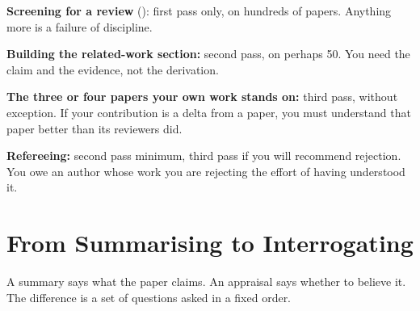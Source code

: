 \begin{conceptbox}
\begin{tight}
  \item \textbf{Screening for a review} (): first pass only, on
    hundreds of papers. Anything more is a failure of discipline.
  \item \textbf{Building the related-work section:} second pass, on perhaps
    50. You need the claim and the evidence, not the derivation.
  \item \textbf{The three or four papers your own work stands on:} third pass,
    without exception. If your contribution is a delta from a paper, you must
    understand that paper better than its reviewers did.
  \item \textbf{Refereeing:} second pass minimum, third pass if you will
    recommend rejection. You owe an author whose work you are rejecting the
    effort of having understood it.
\end{tight}
\end{conceptbox}

\section{From Summarising to Interrogating}

A summary says what the paper claims. An appraisal says whether to believe it.
The difference is a set of questions asked in a fixed order.

